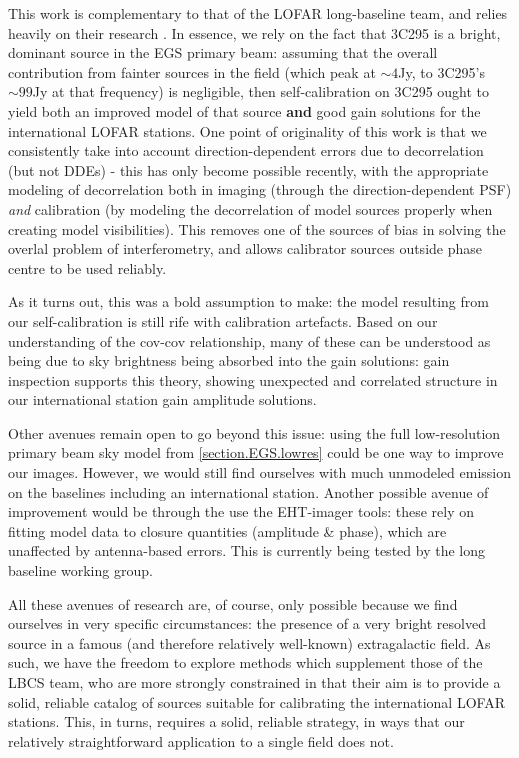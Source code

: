 \pg
This work is complementary to that of the LOFAR long-baseline team, and relies heavily on their research . In essence, we rely on the fact that 3C295 is a bright, dominant source in the EGS primary beam: assuming that the overall contribution from fainter sources in the field (which peak at $\sim4$Jy, to 3C295's $\sim99$Jy at that frequency) is negligible, then self-calibration on 3C295 ought to yield both an improved model of that source \textbf{and} good gain solutions for the international LOFAR stations. One point of originality of this work is that we consistently take into account direction-dependent errors due to decorrelation (but not DDEs) - this has only become possible recently, with the appropriate modeling of decorrelation both in imaging (through the direction-dependent PSF) \textit{and} calibration (by modeling the decorrelation of model sources properly when creating model visibilities). This removes one of the sources of bias in solving the overlal problem of interferometry, and allows calibrator sources outside phase centre to be used reliably.

\pg
As it turns out, this was a bold assumption to make: the model resulting from our self-calibration is still rife with calibration artefacts. Based on our understanding of the cov-cov relationship, many of these can be understood as being due to sky brightness being absorbed into the gain solutions: gain inspection supports this theory, showing unexpected and correlated structure in our international station gain amplitude solutions. 

\pg
Other avenues remain open to go beyond this issue: using the full low-resolution primary beam sky model from \cref{section.EGS.lowres} could be one way to improve our images. However, we would still find ourselves with much unmodeled emission on the baselines including an international station. Another possible avenue of improvement would be through the use the EHT-imager tools: these rely on fitting model data to closure quantities (amplitude \& phase), which are unaffected by antenna-based errors. This is currently being tested by the long baseline working group.

\pg
All these avenues of research are, of course, only possible because we find ourselves in very specific circumstances: the presence of a very bright resolved source in a famous (and therefore relatively well-known) extragalactic field. As such, we have the freedom to explore methods which supplement those of the LBCS team, who are more strongly constrained in that their aim is to provide a solid, reliable catalog of sources suitable for calibrating the international LOFAR stations. This, in turns, requires a solid, reliable strategy, in ways that our relatively straightforward application to a single field does not.

